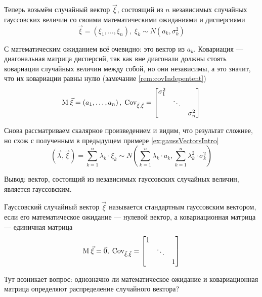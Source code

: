 \begin{example}\label{example:gaussianVector:gaussianElements}
  Теперь возьмём случайный вектор $\vec{\xi}$, состоящий из $n$ независимых
  случайных гауссовских величин со своими математическими ожиданиями
  и дисперсиями
  $$\vec{\xi} = \left( \xi_1, \dots, \xi_n \right),\;
      \xi_k \sim N\left( a_k, \sigma_k^2 \right)$$

  С математическим ожиданием всё очевидно: это вектор
  из $a_k$. Ковариация --- диагональная матрица дисперсий, так как вне
  диагонали должны стоять ковариации случайных величин между собой,
  но они независимы, а это значит, что их ковариации равны нулю
  (замечание \ref{rem:covIndepentent})
  $$\operatorname{M}_{} \vec{\xi} = \left( a_1, \dots, a_n \right),\;
      \operatorname{Cov^{}_{\vec{\xi}, \vec{\xi}}} =
      \begin{bmatrix}
      \sigma_1^2 & & \\
      & \ddots & \\
      & & \sigma_n^2
      \end{bmatrix}$$

  Снова рассматриваем скалярное произведением и видим, что результат сложнее,
  но схож с полученным в предыдущем примере \ref{ex:gaussVectorsIntro}
  $$\left( \vec{\lambda}, \vec{\xi} \right)
      = \sum_{k=1}^{n} \lambda_k \cdot \xi_k \sim
      N\left( \sum_{k=1}^{n} \lambda_k \cdot a_k,
      \sum_{k=1}^{n} \lambda_k^2 \cdot \sigma_k^2 \right)$$

  Вывод: вектор, состоящий из независимых гауссовских случайных величин,
  является гауссовским.
\end{example}

\begin{definition}
  Гауссовский случайный вектор $\vec{\xi}$ называется стандартным гауссовским
  вектором, если его математическое ожидание --- нулевой вектор,
  а ковариационная матрица --- единичная матрица
  $$\operatorname{M}_{} \vec{\xi} = \vec{0},\;
      \operatorname{Cov^{}_{\vec{\xi}, \vec{\xi}}} =
      \begin{bmatrix}
      1 & & \\
      & \ddots & \\
      & & 1
      \end{bmatrix}$$
\end{definition}

Тут возникает вопрос: однозначно ли математическое ожидание
и ковариационная матрица определяют распределение случайного вектора?

